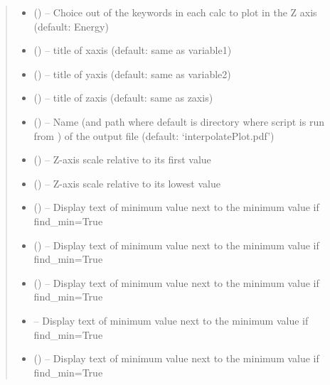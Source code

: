\documentclass[letterpaper,10pt,english]{sphinxmanual}
\begin{document}
\begin{fulllineitems}
\begin{quote}
\begin{description}
\begin{itemize}
\item {} 
 () -- Choice out of the keywords in each calc to plot in the Z axis (default: Energy)

\item {} 
 () -- title of xaxis (default: same as variable1)

\item {} 
 () -- title of yaxis (default: same as variable2)

\item {} 
 () -- title of zaxis (default: same as zaxis)

\item {} 
 () -- Name (and path where default is directory where script is run from ) of the
output file (default: `interpolatePlot.pdf')

\item {} 
 () -- Z-axis scale relative to its first value

\item {} 
 () -- Z-axis scale relative to its lowest value

\item {} 
 () -- Display text of minimum value next to the minimum value if find\_min=True

\item {} 
 () -- Display text of minimum value next to the minimum value if find\_min=True

\item {} 
 () -- Display text of minimum value next to the minimum value if find\_min=True

\item {} 
 -- Display text of minimum value next to the minimum value if find\_min=True

\item {} 
 () -- Display text of minimum value next to the minimum value if find\_min=True


\end{itemize}
\end{description}
\end{quote}
\end{fulllineitems}
\end{document}
